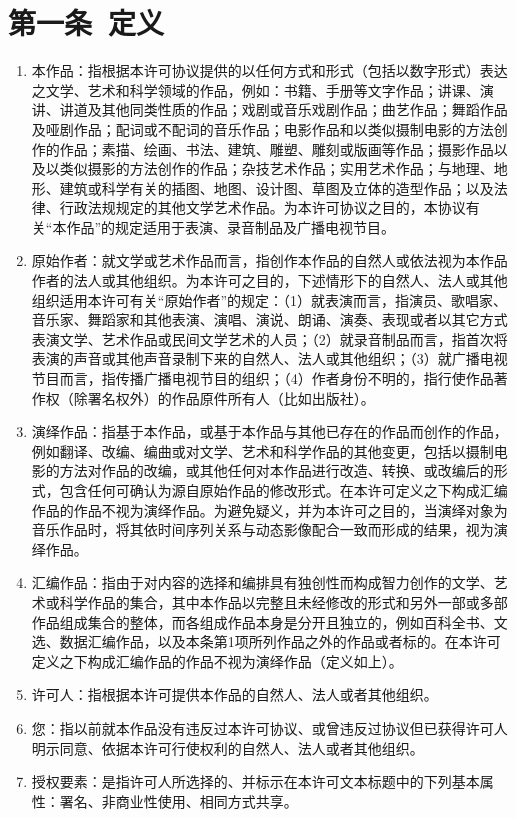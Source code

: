 \section{第一条\ 定义} 
\begin{enumerate}
	\item 本作品：指根据本许可协议提供的以任何方式和形式（包括以数字形式）表达之文学、艺术和科学领域的作品，例如：书籍、手册等文字作品；讲课、演讲、讲道及其他同类性质的作品；戏剧或音乐戏剧作品；曲艺作品；舞蹈作品及哑剧作品；配词或不配词的音乐作品；电影作品和以类似摄制电影的方法创作的作品；素描、绘画、书法、建筑、雕塑、雕刻或版画等作品；摄影作品以及以类似摄影的方法创作的作品；杂技艺术作品；实用艺术作品；与地理、地形、建筑或科学有关的插图、地图、设计图、草图及立体的造型作品；以及法律、行政法规规定的其他文学艺术作品。为本许可协议之目的，本协议有关“本作品”的规定适用于表演、录音制品及广播电视节目。 
	\item 原始作者：就文学或艺术作品而言，指创作本作品的自然人或依法视为本作品作者的法人或其他组织。为本许可之目的，下述情形下的自然人、法人或其他组织适用本许可有关“原始作者”的规定：（1）就表演而言，指演员、歌唱家、音乐家、舞蹈家和其他表演、演唱、演说、朗诵、演奏、表现或者以其它方式表演文学、艺术作品或民间文学艺术的人员；（2）就录音制品而言，指首次将表演的声音或其他声音录制下来的自然人、法人或其他组织；（3）就广播电视节目而言，指传播广播电视节目的组织；（4）作者身份不明的，指行使作品著作权（除署名权外）的作品原件所有人（比如出版社）。
	\item 演绎作品：指基于本作品，或基于本作品与其他已存在的作品而创作的作品，例如翻译、改编、编曲或对文学、艺术和科学作品的其他变更，包括以摄制电影的方法对作品的改编，或其他任何对本作品进行改造、转换、或改编后的形式，包含任何可确认为源自原始作品的修改形式。在本许可定义之下构成汇编作品的作品不视为演绎作品。为避免疑义，并为本许可之目的，当演绎对象为音乐作品时，将其依时间序列关系与动态影像配合一致而形成的结果，视为演绎作品。
	\item 汇编作品：指由于对内容的选择和编排具有独创性而构成智力创作的文学、艺术或科学作品的集合，其中本作品以完整且未经修改的形式和另外一部或多部作品组成集合的整体，而各组成作品本身是分开且独立的，例如百科全书、文选、数据汇编作品，以及本条第1项所列作品之外的作品或者标的。在本许可定义之下构成汇编作品的作品不视为演绎作品（定义如上）。
	\item 许可人：指根据本许可提供本作品的自然人、法人或者其他组织。
	\item 您：指以前就本作品没有违反过本许可协议、或曾违反过协议但已获得许可人明示同意、依据本许可行使权利的自然人、法人或者其他组织。
	\item 授权要素：是指许可人所选择的、并标示在本许可文本标题中的下列基本属性：署名、非商业性使用、相同方式共享。

\end{enumerate}
